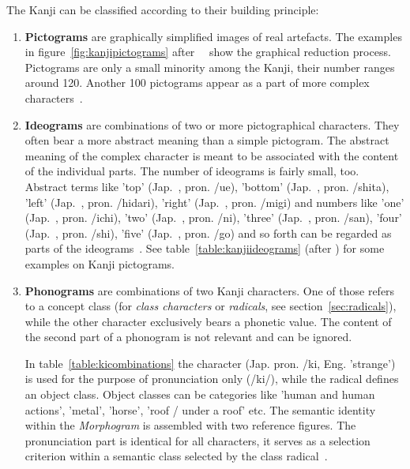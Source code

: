 The Kanji can be classified according to their building principle:
\begin{enumerate}
 \item \textbf{Pictograms} are graphically simplified images of real artefacts.
       The examples in figure~\ref{fig:kanjipictograms} 
       after~~\citeyear{Kano1990} show the graphical 
       reduction process. Pictograms are only a small minority among the Kanji,
       their number ranges around 120. Another 100 pictograms appear as a part of
       more complex characters~.
       
 \item \textbf{Ideograms} are combinations of two or more pictographical
       characters. They often bear a more abstract meaning than a simple 
       pictogram. The abstract meaning of the complex character is meant to be 
       associated with the content of the individual parts. The number of 
       ideograms is fairly small, too. Abstract terms like 
       'top' (Jap.~, pron. /ue), 
       'bottom' (Jap.~, pron. /shita),
       'left' (Jap.~, pron. /hidari),
       'right' (Jap.~, pron. /migi)
       and numbers like
       'one' (Jap.~, pron. /ichi),
       'two' (Jap.~, pron. /ni),
       'three' (Jap.~, pron. /san),
       'four' (Jap.~, pron. /shi),
       'five' (Jap.~, pron. /go)
       and so forth can be regarded as parts of the 
       ideograms~.
       See table~\ref{table:kanjiideograms} (after ) for 
       some examples on Kanji pictograms.

 \item \textbf{Phonograms} are combinations of two Kanji characters. One of those
       refers to a concept class (for \emph{class characters} or \emph{radicals},
       see section~\ref{sec:radicals}), 
       while the other character exclusively bears a phonetic value. The content
       of the second part of a phonogram is not relevant and can be ignored.

       In table~\ref{table:kicombinations} the character 
        (Jap. pron. /ki, Eng. 'strange') is used for the purpose
       of pronunciation only (/ki/), while the radical defines an
       object class. Object classes can be categories like 'human and human 
       actions', 'metal', 'horse', 'roof / under a roof' etc.
       The semantic identity within the \emph{Morphogram} is assembled with two
       reference figures. The pronunciation part is identical for all characters,
       it serves as a selection criterion within a semantic class selected by 
       the class radical~.

\end{enumerate}

